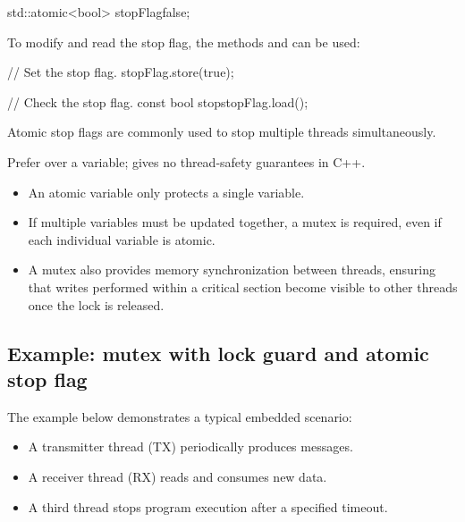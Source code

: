 \begin{cppcode}
std::atomic<bool> stopFlag{false};
\end{cppcode}

\noindent To modify and read the stop flag, the methods  and  can be
used:

\begin{cppcode}
// Set the stop flag.
stopFlag.store(true);

// Check the stop flag.
const bool stop{stopFlag.load()};
\end{cppcode}

\noindent Atomic stop flags are commonly used to stop multiple threads simultaneously.

\begin{aside}
Prefer  over a  variable;  gives no thread-safety
guarantees in C++.
\end{aside}

\note
\begin{itemize}
  \item An atomic variable only protects a single variable.
  \item If multiple variables must be updated together, a mutex is required, even if each
    individual variable is atomic.
  \item A mutex also provides memory synchronization between threads, ensuring that writes
    performed within a critical section become visible to other threads once the lock is
    released.
\end{itemize}

\subsection{Example: mutex with lock guard and atomic stop flag}
\label{c6:sec:txrx}
The example below demonstrates a typical embedded scenario:
\begin{itemize}
  \item A transmitter thread (TX) periodically produces messages.
  \item A receiver thread (RX) reads and consumes new data.
  \item A third thread stops program execution after a specified timeout.
\end{itemize}

